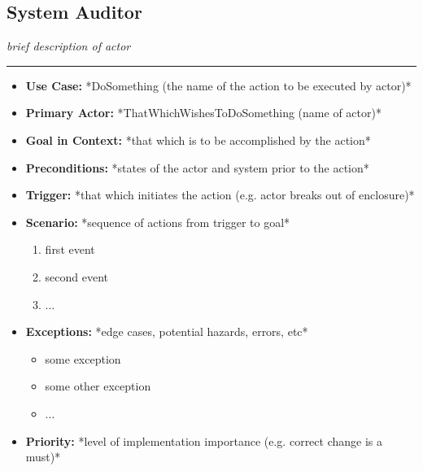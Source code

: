 \documentclass[12pt]{article}
\begin{document}
    \subsection{System Auditor}
    \textit{brief description of actor}
    \par\noindent\rule{\textwidth}{0.4pt}    
    \begin{itemize}
        \item[]\textbf{Use Case:}                                
            *DoSomething (the name of the action to be executed by actor)*

        \item[]\textbf{Primary Actor:}
            *ThatWhichWishesToDoSomething (name of actor)*

        \item[]\textbf{Goal in Context:}
            *that which is to be accomplished by the action*

        \item[]\textbf{Preconditions:}
            *states of the actor and system prior to the action*

        \item[]\textbf{Trigger:}
            *that which initiates the action (e.g. actor breaks out of enclosure)*

        \item[]\textbf{Scenario:}
            *sequence of actions from trigger to goal*
            \begin{enumerate}
                \item first event
                \item second event
                \item ...
            \end{enumerate}

        \item[]\textbf{Exceptions:}
            *edge cases, potential hazards, errors, etc*
            \begin{itemize}
                \item[] some exception
                \item[] some other exception                
                \item[] ...
            \end{itemize}

        \item[]\textbf{Priority:}
            *level of implementation importance (e.g. correct change is a must)*


\end{itemize}
\end{document}
